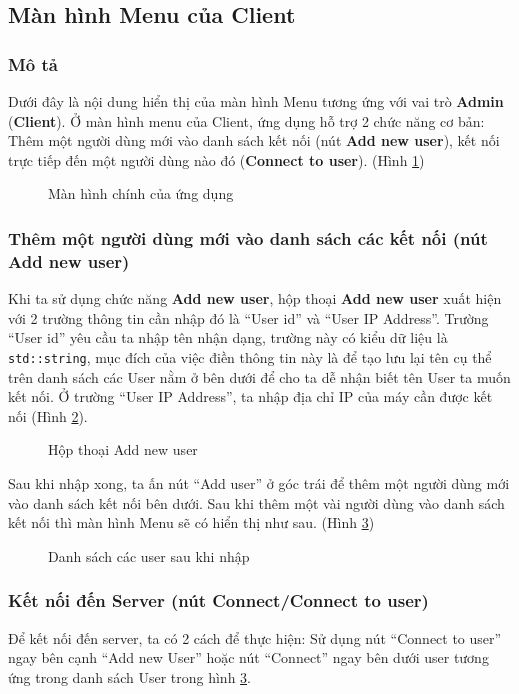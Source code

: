 \subsection{Màn hình Menu của Client}
\subsubsection{Mô tả}
Dưới đây là nội dung hiển thị của màn hình Menu tương ứng với vai trò \textbf{Admin} (\textbf{Client}). Ở màn hình menu của Client, ứng dụng hỗ trợ 2 chức năng cơ bản: Thêm một người dùng mới vào danh sách kết nối (nút \textbf{Add new user}), kết nối trực tiếp đến một người dùng nào đó (\textbf{Connect to user}). (Hình \ref{fig:ClientMenuWindow})
\begin{figure}[H]
	\caption{Màn hình chính của ứng dụng}
	\label{fig:ClientMenuWindow}
\end{figure}
\subsubsection{Thêm một người dùng mới vào danh sách các kết nối (nút Add new user)}
Khi ta sử dụng chức năng \textbf{Add new user}, hộp thoại \textbf{Add new user} xuất hiện với 2 trường thông tin cần nhập đó là ``User id'' và ``User IP Address''. Trường ``User id'' yêu cầu ta nhập tên nhận dạng, trường này có kiểu dữ liệu là \verb|std::string|, mục đích của việc điền thông tin này là để tạo lưu lại tên cụ thể trên danh sách các User nằm ở bên dưới để cho ta dễ nhận biết tên User ta muốn kết nối. Ở trường ``User IP Address'', ta nhập địa chỉ IP của máy cần được kết nối (Hình \ref{fig:AddNewUserBox}). 

\begin{figure}[H]
	\caption{Hộp thoại Add new user}
	\label{fig:AddNewUserBox}
\end{figure}

Sau khi nhập xong, ta ấn nút ``Add user'' ở góc trái để thêm một người dùng mới vào danh sách kết nối bên dưới. Sau khi thêm một vài người dùng vào danh sách kết nối thì màn hình Menu sẽ có hiển thị như sau. (Hình \ref{fig:UserList})

\begin{figure}[H]
	\caption{Danh sách các user sau khi nhập}
	\label{fig:UserList}
\end{figure}

\subsubsection{Kết nối đến Server (nút Connect/Connect to user)}
Để kết nối đến server, ta có 2 cách để thực hiện: Sử dụng nút ``Connect to user'' ngay bên cạnh ``Add new User'' hoặc nút ``Connect'' ngay bên dưới user tương ứng trong danh sách User trong hình \ref{fig:UserList}.

